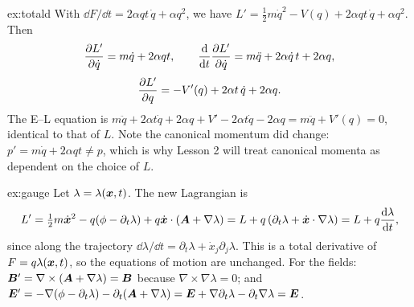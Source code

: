 \documentclass[11pt]{article}
\begin{document}
\begin{solution}{ex:totald}
With $\dd F/\dd t=2\alpha qt\,\dot q+\alpha q^2$, we have $L'=\tfrac12m\dot q^2-V(q)+2\alpha qt\,\dot q+\alpha q^2$. Then
\[
 \frac{\partial L'}{\partial \dot q}=m\dot q+2\alpha qt,\qquad
 \frac{\mathrm{d} }{\mathrm{d} t}\frac{\partial L'}{\partial \dot q}=m\ddot q+2\alpha\dot q\,t+2\alpha q,
\]
\[
 \frac{\partial L'}{\partial q}=-V'(q)+2\alpha t\,\dot q+2\alpha q .
\]
The E--L equation is $m\ddot q+2\alpha t\dot q+2\alpha q+V'-2\alpha t\dot q-2\alpha q=m\ddot q+V'(q)=0$, identical to that of $L$. Note the canonical momentum did change: $p'=m\dot q+2\alpha qt\neq p$, which is why Lesson 2 will treat canonical momenta as dependent on the choice of $L$.
\end{solution}

\begin{solution}{ex:gauge}
Let $\lambda=\lambda(\bm{x},t)$. The new Lagrangian is
\[
 L'=\tfrac12m\dot{\bm{x}}^2-q(\phi-\partial_t\lambda)+q\dot{\bm{x}}\cdot(\bm{A}+\nabla\lambda)=L+q\left(\partial_t\lambda+\dot{\bm{x}}\cdot\nabla\lambda\right)=L+q\frac{\mathrm{d} \lambda}{\mathrm{d} t} ,
\]
since along the trajectory $\dd\lambda/\dd t=\partial_t\lambda+\dot x_j\partial_j\lambda$. This is a total derivative of $F=q\lambda(\bm{x},t)$, so the equations of motion are unchanged. For the fields: $\bm{B}'=\nabla\times(\bm{A}+\nabla\lambda)=\bm{B}$ because $\nabla\times\nabla\lambda=0$; and $\bm{E}'=-\nabla(\phi-\partial_t\lambda)-\partial_t(\bm{A}+\nabla\lambda)=\bm{E}+\nabla\partial_t\lambda-\partial_t\nabla\lambda=\bm{E}$.
\end{solution}
\end{document}
